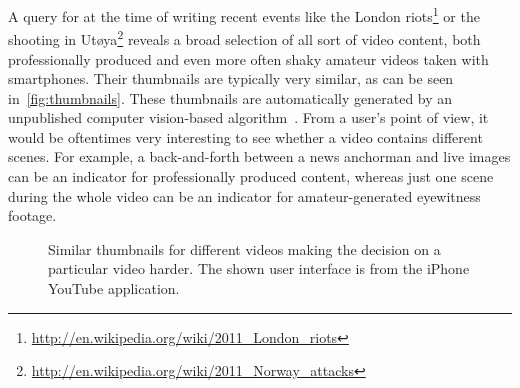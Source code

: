 \documentclass[runningheads,a4paper]{llncs}
\begin{document}
A query for at the time of writing recent events like the London riots\footnote{\url{http://en.wikipedia.org/wiki/2011_London_riots}} or the shooting in Utøya\footnote{\url{http://en.wikipedia.org/wiki/2011_Norway_attacks}} reveals a broad selection of all sort of video content, both professionally produced and even more often shaky amateur videos taken with smartphones. Their thumbnails are typically very similar, as can be seen in~\autoref{fig:thumbnails}. These thumbnails are automatically generated by an unpublished computer vision-based algorithm~\cite{googleresearch}. From a user's point of view, it would be oftentimes very interesting to see whether a video contains different scenes. For example, a back-and-forth between a news anchorman and live images can be an indicator for professionally  produced content, whereas just one scene during the whole video can be an indicator for amateur-generated eyewitness footage.

\begin{figure}[htb!]
  \begin{center}
\hspace{10pt}
  \caption{Similar thumbnails for different videos making the decision on a particular video harder. The shown user interface is from the iPhone YouTube application.}
  \label{fig:thumbnails}
  \end{center}  
\end{figure}
\end{document}
